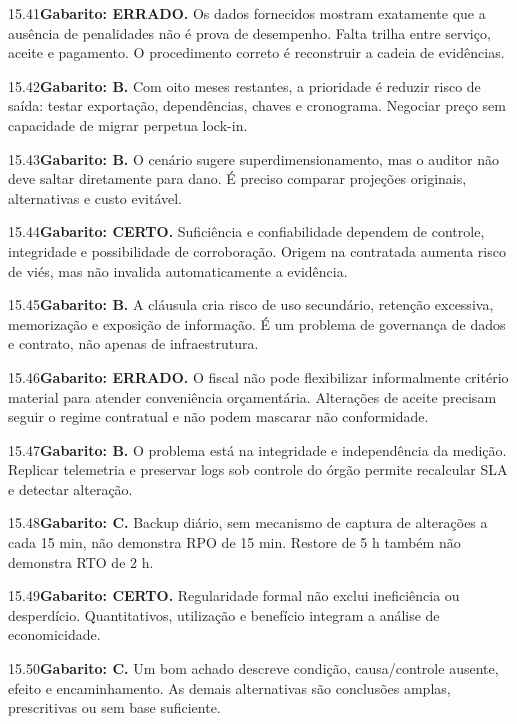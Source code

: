 \begin{solucao}{15.41}\textbf{Gabarito: ERRADO.} Os dados fornecidos mostram exatamente que a ausência de penalidades não é prova de desempenho. Falta trilha entre serviço, aceite e pagamento. O procedimento correto é reconstruir a cadeia de evidências.\end{solucao}
\begin{solucao}{15.42}\textbf{Gabarito: B.} Com oito meses restantes, a prioridade é reduzir risco de saída: testar exportação, dependências, chaves e cronograma. Negociar preço sem capacidade de migrar perpetua lock-in.\end{solucao}
\begin{solucao}{15.43}\textbf{Gabarito: B.} O cenário sugere superdimensionamento, mas o auditor não deve saltar diretamente para dano. É preciso comparar projeções originais, alternativas e custo evitável.\end{solucao}
\begin{solucao}{15.44}\textbf{Gabarito: CERTO.} Suficiência e confiabilidade dependem de controle, integridade e possibilidade de corroboração. Origem na contratada aumenta risco de viés, mas não invalida automaticamente a evidência.\end{solucao}
\begin{solucao}{15.45}\textbf{Gabarito: B.} A cláusula cria risco de uso secundário, retenção excessiva, memorização e exposição de informação. É um problema de governança de dados e contrato, não apenas de infraestrutura.\end{solucao}
\begin{solucao}{15.46}\textbf{Gabarito: ERRADO.} O fiscal não pode flexibilizar informalmente critério material para atender conveniência orçamentária. Alterações de aceite precisam seguir o regime contratual e não podem mascarar não conformidade.\end{solucao}
\begin{solucao}{15.47}\textbf{Gabarito: B.} O problema está na integridade e independência da medição. Replicar telemetria e preservar logs sob controle do órgão permite recalcular SLA e detectar alteração.\end{solucao}
\begin{solucao}{15.48}\textbf{Gabarito: C.} Backup diário, sem mecanismo de captura de alterações a cada 15 min, não demonstra RPO de 15 min. Restore de 5 h também não demonstra RTO de 2 h.\end{solucao}
\begin{solucao}{15.49}\textbf{Gabarito: CERTO.} Regularidade formal não exclui ineficiência ou desperdício. Quantitativos, utilização e benefício integram a análise de economicidade.\end{solucao}
\begin{solucao}{15.50}\textbf{Gabarito: C.} Um bom achado descreve condição, causa/controle ausente, efeito e encaminhamento. As demais alternativas são conclusões amplas, prescritivas ou sem base suficiente.\end{solucao}

